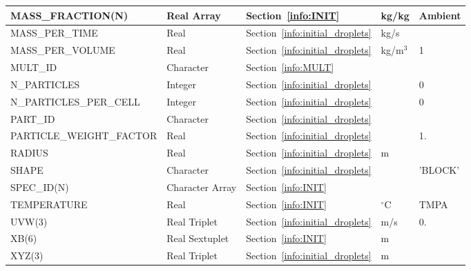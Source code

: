 \documentclass[11pt]{book}
\begin{document}
\begin{longtable}{@{\extracolsep{\fill}}|l|l|l|l|l|}
{\ct MASS\_FRACTION(N)}         & Real Array        & Section~\ref{info:INIT}                       & kg/kg         & Ambient       \\ \hline
{\ct MASS\_PER\_TIME}           & Real              & Section~\ref{info:initial_droplets}           & kg/s          &               \\ \hline
{\ct MASS\_PER\_VOLUME}         & Real              & Section~\ref{info:initial_droplets}           & kg/m$^3$      & 1             \\ \hline
{\ct MULT\_ID }                 & Character         & Section~\ref{info:MULT}                       &               &               \\ \hline
{\ct N\_PARTICLES}              & Integer           & Section~\ref{info:initial_droplets}           &               & 0             \\ \hline
{\ct N\_PARTICLES\_PER\_CELL}   & Integer           & Section~\ref{info:initial_droplets}           &               & 0             \\ \hline
{\ct PART\_ID}                  & Character         & Section~\ref{info:initial_droplets}           &               &               \\ \hline
{\ct PARTICLE\_WEIGHT\_FACTOR}  & Real              & Section~\ref{info:initial_droplets}           &               & 1.            \\ \hline
{\ct RADIUS}                    & Real              & Section~\ref{info:initial_droplets}           & m             &               \\ \hline
{\ct SHAPE}                     & Character         & Section~\ref{info:initial_droplets}           &               & {\ct 'BLOCK'} \\ \hline
{\ct SPEC\_ID(N)}               & Character Array   & Section~\ref{info:INIT}                       &               &               \\ \hline
{\ct TEMPERATURE}               & Real              & Section~\ref{info:INIT}                       & $^\circ$C     & {\ct TMPA}    \\ \hline
{\ct UVW(3)}                    & Real Triplet      & Section~\ref{info:initial_droplets}           & m/s           & 0.            \\ \hline
{\ct XB(6)}                     & Real Sextuplet    & Section~\ref{info:INIT}                       & m             &               \\ \hline
{\ct XYZ(3)}                    & Real Triplet      & Section~\ref{info:initial_droplets}           & m             &               \\ \hline
\end{longtable}
\end{document}
